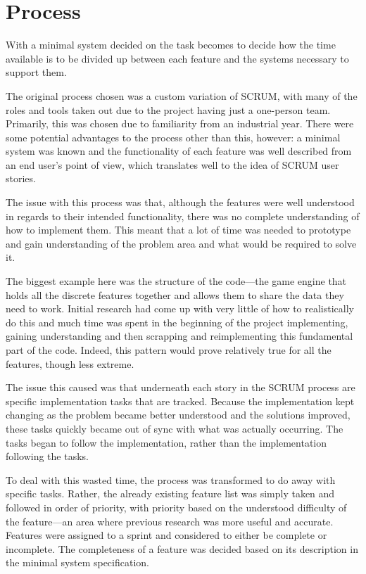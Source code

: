 \section{Process}
With a minimal system decided on the task becomes to decide how the time available is to be divided up between each feature and the systems necessary to support them.

The original process chosen was a custom variation of SCRUM, with many of the roles and tools taken out due to the project having just a one-person team. Primarily, this was chosen due to familiarity from an industrial year. There were some potential advantages to the process other than this, however: a minimal system was known and the functionality of each feature was well described from an end user's point of view, which translates well to the idea of SCRUM user stories.

The issue with this process was that, although the features were well understood in regards to their intended functionality, there was no complete understanding of how to implement them. This meant that a lot of time was needed to prototype and gain understanding of the problem area and what would be required to solve it.

The biggest example here was the structure of the code---the game engine that holds all the discrete features together and allows them to share the data they need to work. Initial research had come up with very little of how to realistically do this and much time was spent in the beginning of the project implementing, gaining understanding and then scrapping and reimplementing this fundamental part of the code. Indeed, this pattern would prove relatively true for all the features, though less extreme.

The issue this caused was that underneath each story in the SCRUM process are specific implementation tasks that are tracked. Because the implementation kept changing as the problem became better understood and the solutions improved, these tasks quickly became out of sync with what was actually occurring. The tasks began to follow the implementation, rather than the implementation following the tasks.

To deal with this wasted time, the process was transformed to do away with specific tasks. Rather, the already existing feature list was simply taken and followed in order of priority, with priority based on the understood difficulty of the feature---an area where previous research was more useful and accurate. Features were assigned to a sprint and considered to either be complete or incomplete. The completeness of a feature was decided based on its description in the minimal system specification.

